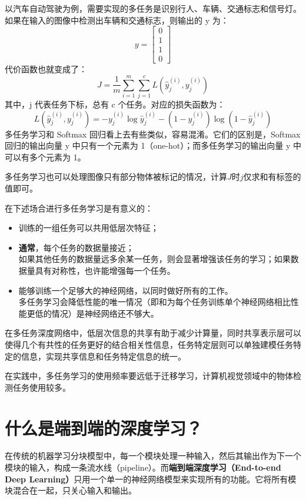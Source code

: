 \documentclass[../../main.tex]{subfiles}
\begin{document}
以汽车自动驾驶为例，需要实现的多任务是识别行人、车辆、交通标志和信号灯。如果在输入的图像中检测出车辆和交通标志，则输出的 y 为：\[y=\begin{bmatrix}
        0 \\1\\1\\0
    \end{bmatrix}\]
代价函数也就变成了：
\[J=\frac{1}{m} \sum^m_{i=1} \sum^c_{j=1} L(\hat y_j^{(i)}, y_j^{(i)})\]
其中，j 代表任务下标，总有 c 个任务。对应的损失函数为：
\[L(\hat y_j^{(i)}, y_j^{(i)}) = -y_j^{(i)} \log \hat y_j^{(i)} - (1 -y_j^{(i)})\log(1 - \hat y_j^{(i)})\]
多任务学习和 Softmax 回归看上去有些类似，容易混淆。它们的区别是，Softmax 回归的输出向量 y 中只有一个元素为 1（one-hot）；而多任务学习的输出向量 y 中可以有多个元素为 1。

多任务学习也可以处理图像只有部分物体被标记的情况，计算\(J\)时\(j\)仅求和有标签的值即可。

在下述场合进行多任务学习是有意义的：
\begin{itemize}
    \item 训练的一组任务可以共用低层次特征；
    \item \textbf{通常}，每个任务的数据量接近；\\如果其他任务的数据量远多余某一任务，则会显著增强该任务的学习；如果数据量具有对称性，也许能增强每一个任务。
    \item 能够训练一个足够大的神经网络，以同时做好所有的工作。\\多任务学习会降低性能的唯一情况（即和为每个任务训练单个神经网络相比性能更低的情况）是神经网络还不够大。
\end{itemize}

在多任务深度网络中，低层次信息的共享有助于减少计算量，同时共享表示层可以使得几个有共性的任务更好的结合相关性信息，任务特定层则可以单独建模任务特定的信息，实现共享信息和任务特定信息的统一。

在实践中，多任务学习的使用频率要远低于迁移学习，计算机视觉领域中的物体检测任务使用较多。

\section{什么是端到端的深度学习？}
在传统的机器学习分块模型中，每一个模块处理一种输入，然后其输出作为下一个模块的输入，构成一条流水线（pipeline）。而\textbf{端到端深度学习（End-to-end Deep Learning）}只用一个单一的神经网络模型来实现所有的功能。它将所有模块混合在一起，只关心输入和输出。
\end{document}
